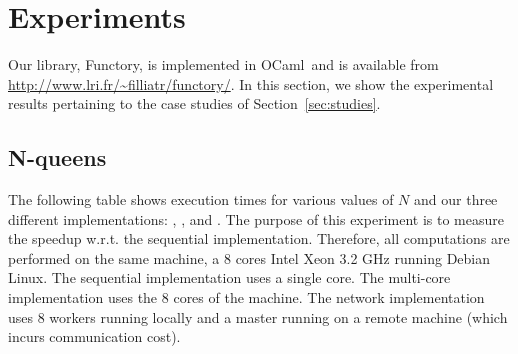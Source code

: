 \documentclass[a4paper,12pt]{article}
\newcommand{\Ocaml}{OCaml}
\newcommand{\functory}{\textsf{Functory}}
\begin{document}

\section{Experiments}\label{sec:experiments}

Our library, \functory, is implemented in \Ocaml\ and is available
from \url{http://www.lri.fr/~filliatr/functory/}.
In this section, we show the experimental results pertaining to the
case studies of Section~\ref{sec:studies}.

\subsection{N-queens}

The following table shows execution times for various values of $N$
and our three different implementations: , , and
. The purpose of this experiment is to measure the speedup
w.r.t. the sequential implementation. Therefore, all
computations are performed on the same machine, a 8 cores Intel Xeon
3.2 GHz running Debian Linux. The sequential implementation uses a
single core. The multi-core implementation uses the 8 cores of
the machine. The network implementation uses 8 workers running locally and
a master running on a remote machine (which incurs communication cost).
\end{document}
